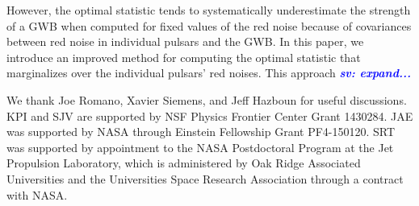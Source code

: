 \documentclass[twocolumn,aps,prd,superscriptaddress]{revtex4-1}
\newcommand{\sv}[1]{\textcolor{blue}{\it{\textbf{sv: #1}}} }
\begin{document}
However, the optimal statistic tends to systematically underestimate the strength of a GWB 
when computed for fixed values of the red noise because of 
covariances between red noise in individual pulsars and the GWB. 
In this paper, we introduce an improved method for computing the optimal statistic 
that marginalizes over the individual pulsars' red noises. 
This approach \sv{expand...}


\acknowledgments
We thank Joe Romano, Xavier Siemens, and Jeff Hazboun for useful discussions. 
KPI and SJV are supported by NSF Physics Frontier Center Grant 1430284.
JAE was supported by NASA through Einstein Fellowship Grant PF4-150120. 
SRT was supported by appointment to the NASA Postdoctoral Program 
at the Jet Propulsion Laboratory, which is administered by Oak Ridge Associated Universities 
and the Universities Space Research Association through a contract with NASA. 




\end{document}
